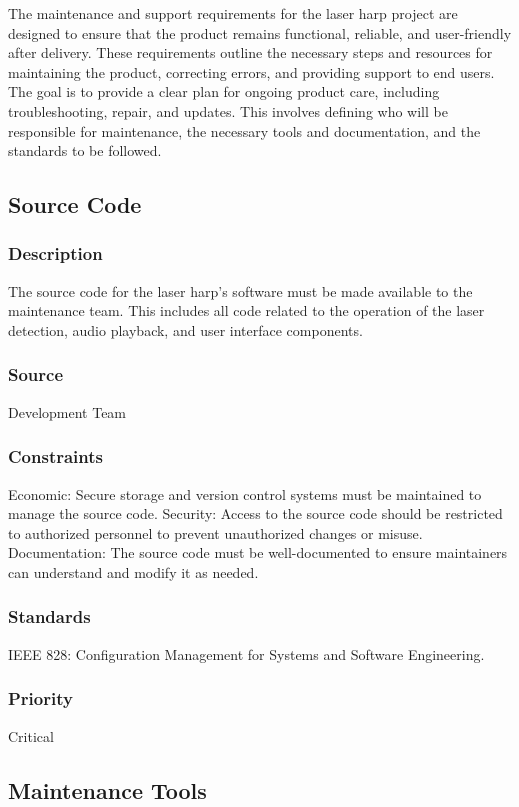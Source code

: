 The maintenance and support requirements for the laser harp project are designed to ensure that the product remains functional, reliable, and user-friendly after delivery. These requirements outline the necessary steps and resources for maintaining the product, correcting errors, and providing support to end users. The goal is to provide a clear plan for ongoing product care, including troubleshooting, repair, and updates. This involves defining who will be responsible for maintenance, the necessary tools and documentation, and the standards to be followed.


\subsection{Source Code}
\subsubsection{Description}
The source code for the laser harp's software must be made available to the maintenance team. This includes all code related to the operation of the laser detection, audio playback, and user interface components.
\subsubsection{Source}
Development Team
\subsubsection{Constraints}
Economic: Secure storage and version control systems must be maintained to manage the source code.
Security: Access to the source code should be restricted to authorized personnel to prevent unauthorized changes or misuse.
Documentation: The source code must be well-documented to ensure maintainers can understand and modify it as needed.
\subsubsection{Standards}
IEEE 828: Configuration Management for Systems and Software Engineering.
\subsubsection{Priority}
Critical


\subsection{Maintenance Tools}
